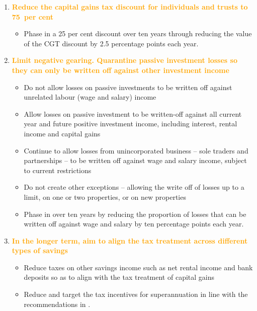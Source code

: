\begin{recommendations}[-40pt]
\raggedright
\begin{enumerate}
\item \textcolor{Orange}{\textbf{Reduce the capital gains tax discount for individuals and trusts to 75~per cent}} 
\begin{itemize}
  \item Phase in a 25 per cent discount over ten years through reducing the value of the CGT discount by 2.5 percentage points each year.
\end{itemize}
\item \textcolor{Orange}{\textbf{Limit negative gearing. Quarantine passive investment losses so they can only be written off against other investment income}}
\begin{itemize}
  \item 	Do not allow losses on passive investments to be written off against unrelated labour (wage and salary) income 
\item 	Allow losses on passive investment to be written-off against all current year and future positive investment income, including interest, rental income and capital gains 
\item 	Continue to allow losses from unincorporated business -- sole traders and partnerships -- to be written off against wage and salary income, subject to current restrictions
\item 	Do not create other exceptions -- allowing the write off of losses up to a limit, on one or two properties, or on new properties
\item 	Phase in over ten years by reducing the proportion of losses that can be written off against wage and salary by ten percentage points each year.
\end{itemize}

\item \textcolor{Orange}{\textbf{In the longer term, aim to align the tax treatment across different types of savings}}
\begin{itemize}
\item	Reduce taxes on other savings income such as net rental income and bank deposits so as to align with the tax treatment of capital gains
\item	Reduce and target the tax incentives for superannuation in line with the recommendations in .
\end{itemize}
\end{enumerate}

\end{recommendations}

